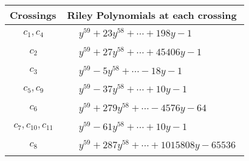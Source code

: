 \documentclass[1p]{elsarticle_modified}
\theoremstyle{definition}
\begin{document}
\begin{tabular}{m{50pt}|m{274pt}}
Crossings & \hspace{64pt}Riley Polynomials at each crossing \\
\hline $$\begin{aligned}c_{1},c_{4}\end{aligned}$$&$\begin{aligned}
&y^{59}+23 y^{58}+\cdots+198 y-1
\end{aligned}$\\
\hline $$\begin{aligned}c_{2}\end{aligned}$$&$\begin{aligned}
&y^{59}+27 y^{58}+\cdots+45406 y-1
\end{aligned}$\\
\hline $$\begin{aligned}c_{3}\end{aligned}$$&$\begin{aligned}
&y^{59}-5 y^{58}+\cdots-18 y-1
\end{aligned}$\\
\hline $$\begin{aligned}c_{5},c_{9}\end{aligned}$$&$\begin{aligned}
&y^{59}-37 y^{58}+\cdots+10 y-1
\end{aligned}$\\
\hline $$\begin{aligned}c_{6}\end{aligned}$$&$\begin{aligned}
&y^{59}+279 y^{58}+\cdots-4576 y-64
\end{aligned}$\\
\hline $$\begin{aligned}c_{7},c_{10},c_{11}\end{aligned}$$&$\begin{aligned}
&y^{59}-61 y^{58}+\cdots+10 y-1
\end{aligned}$\\
\hline $$\begin{aligned}c_{8}\end{aligned}$$&$\begin{aligned}
&y^{59}+287 y^{58}+\cdots+1015808 y-65536
\end{aligned}$\\
\hline
\end{tabular}
\vskip 2pc
\end{document}
